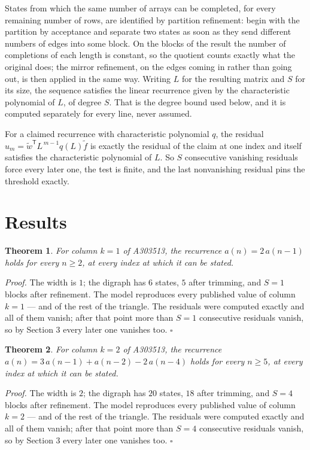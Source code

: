 \documentclass[11pt]{article}
\newtheorem{theorem}{Theorem}
\theoremstyle{definition}
\begin{document}
States from which the same number of arrays can be completed, for every remaining number of rows, are identified by partition refinement: begin with the partition by acceptance and separate two states as soon as they send different numbers of edges into some block. On the blocks of the result the number of completions of each length is constant, so the quotient counts exactly what the original does; the mirror refinement, on the edges coming in rather than going out, is then applied in the same way. Writing $L$ for the resulting matrix and $S$ for its size, the sequence satisfies the linear recurrence given by the characteristic polynomial of $L$, of degree $S$. That is the degree bound used below, and it is computed separately for every line, never assumed.

For a claimed recurrence with characteristic polynomial $q$, the residual $u_m = \tilde w^{\mathsf T}L^{\,m-1}q(L)\tilde f$ is exactly the residual of the claim at one index and itself satisfies the characteristic polynomial of $L$. So $S$ consecutive vanishing residuals force every later one, the test is finite, and the last nonvanishing residual pins the threshold exactly.

\section{Results}

\begin{theorem} For column $k = 1$ of A303513, the recurrence $a(n) = 2\,a(n-1)$ holds for every $n \ge 2$, at every index at which it can be stated.\end{theorem}

{\itshape Proof.} The width is $1$; the digraph has $6$ states, $5$ after trimming, and $S = 1$ blocks after refinement. The model reproduces every published value of column $k = 1$ --- and of the rest of the triangle. The residuals were computed exactly and all of them vanish; after that point more than $S = 1$ consecutive residuals vanish, so by Section 3 every later one vanishes too. $\square$

\begin{theorem} For column $k = 2$ of A303513, the recurrence $a(n) = 3\,a(n-1) + a(n-2) - 2\,a(n-4)$ holds for every $n \ge 5$, at every index at which it can be stated.\end{theorem}

{\itshape Proof.} The width is $2$; the digraph has $20$ states, $18$ after trimming, and $S = 4$ blocks after refinement. The model reproduces every published value of column $k = 2$ --- and of the rest of the triangle. The residuals were computed exactly and all of them vanish; after that point more than $S = 4$ consecutive residuals vanish, so by Section 3 every later one vanishes too. $\square$
\end{document}
